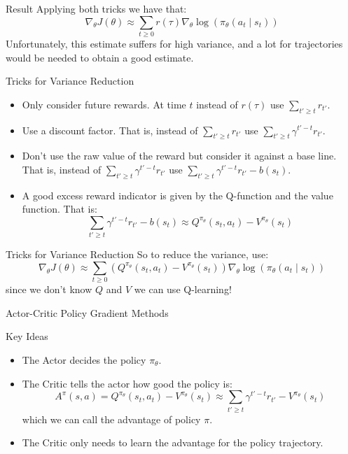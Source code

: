 \documentclass{beamer}
\begin{document}
	\begin{frame}
		\begin{block}{Result}
			Applying both tricks we have that:
			$$ \nabla_\theta J(\theta) \approx \sum_{t\geq0} r(\tau) \nabla_\theta \log \left( \pi_\theta (a_t \mid s_t) \right) $$
			Unfortunately, this estimate suffers for high variance, and a lot for trajectories would be needed to obtain a good estimate.
		\end{block}
	\end{frame}
	
	\begin{frame}
		\begin{block}{Tricks for Variance Reduction}
			\begin{itemize}
				\item Only consider future rewards. At time $ t$ instead of $ r(\tau) $ use $ \sum_{t'\geq t} r_{t'} $.
				\item Use a discount factor. That is, instead of $ \sum_{t'\geq t} r_{t'} $ use $ \sum_{t'\geq t} \gamma^{t'-t} r_{t'} $.
				\item Don't use the raw value of the reward but consider it against a base line. That is, instead of $ \sum_{t'\geq t} \gamma^{t'-t} r_{t'} $ use $ \sum_{t'\geq t} \gamma^{t'-t} r_{t'} -b(s_t) $.
				\item A good excess reward indicator is given by the Q-function and the value function. That is:
				$$ \sum_{t'\geq t} \gamma^{t'-t} r_{t'} -b(s_t) \approx Q^{\pi_\theta}(s_t,a_t) - V^{\pi_\theta} (s_t) $$
			\end{itemize}
		\end{block}
	\end{frame}
	
	\begin{frame}
		\begin{block}{Tricks for Variance Reduction}
			So to reduce the variance, use:
			$$ \nabla_\theta J(\theta) \approx \sum_{t\geq0} \left( Q^{\pi_\theta}(s_t,a_t) - V^{\pi_\theta} (s_t) \right) \nabla_\theta \log \left( \pi_\theta (a_t \mid s_t) \right) $$
			since we don't know $ Q $ and $ V $ we can use Q-learning!
		\end{block}
	\end{frame}
	
	\begin{frame}{Actor-Critic Policy Gradient Methods }
		\begin{block}{Key Ideas}
			\begin{itemize}
				\item The Actor decides the policy $ \pi_\theta $.
				\item The Critic tells the actor how good the policy is: 
				$$ A^\pi (s,a) = Q^{\pi_\theta}(s_t,a_t) - V^{\pi_\theta} (s_t) \approx \sum_{t'\geq t} \gamma^{t'-t} r_{t'} - V^{\pi_\theta} (s_t) $$
				which we can call the advantage of policy $ \pi $.
				\item The Critic only needs to learn the advantage for the policy trajectory.
			\end{itemize}
		\end{block}
	\end{frame}
	
\end{document}
